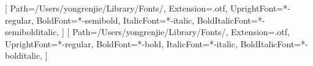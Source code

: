 \usepackage{fontspec}
\usepackage{amsmath}
\usepackage[warnings-off={mathtools-colon,mathtools-overbracket}]{unicode-math}

\setmainfont[
  Path={/Users/yongrenjie/Library/Fonts/},
  Extension=.otf,
  UprightFont={*-regular},
  BoldFont={*-semibold},
  ItalicFont={*-italic},
  BoldItalicFont={*-semibolditalic},
]{minion3}
\setmonofont[
  Path={/Users/yongrenjie/Library/Fonts/},
  Extension=.otf,
  UprightFont={*-Regular},
  BoldFont={*-Bold},
  Scale=MatchLowercase
]{Inconsolata}

[
  Path={/Users/yongrenjie/Library/Fonts/},
  Extension=.otf,
  UprightFont={*-regular},
  BoldFont={*-semibold},
  ItalicFont={*-italic},
  BoldItalicFont={*-semibolditalic},
]
[
  Path={/Users/yongrenjie/Library/Fonts/},
  Extension=.otf,
  UprightFont={*-regular},
  BoldFont={*-bold},
  ItalicFont={*-italic},
  BoldItalicFont={*-bolditalic},
]


\usepackage{microtype}
